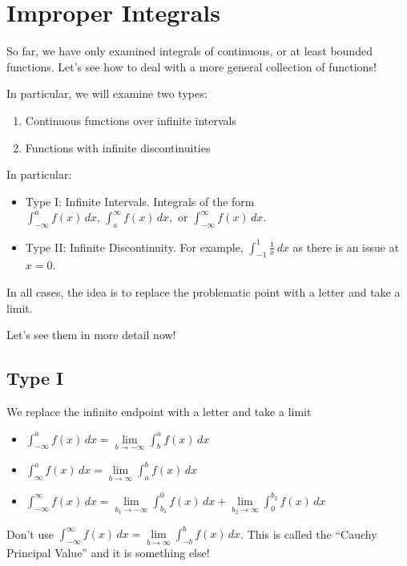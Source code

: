 \section{Improper Integrals}
So far, we have only examined integrals of continuous, or at
least bounded functions. Let's see how to deal with a more general
collection of functions!

In particular, we will examine two types:
\begin{enumerate}[label=(\arabic*)]
    \item Continuous functions over infinite intervals
    \item Functions with infinite discontinuities
\end{enumerate}

In particular:
\begin{itemize}
    \item Type I\@: Infinite Intervals. Integrals of the form
          $ \displaystyle \int_{-\infty}^{a} f(x)\, d{x},\,
              \int_{a}^{\infty} f(x)\, d{x},\text{ or }
              \int_{-\infty}^{\infty} f(x)\, d{x} $.
    \item Type II\@: Infinite Discontinuity. For example,
          $ \displaystyle \int_{-1}^{1} \frac{1}{x} \, d{x} $
          as there is an issue at $ x=0 $.
\end{itemize}

In all cases, the idea is to replace the problematic point with a
letter and take a limit.

Let's see them in more detail now!

\subsection*{Type I}
We replace the infinite endpoint with a letter and take a limit
\begin{itemize}
    \item $ \displaystyle \int_{-\infty}^{a} f(x)\, d{x} =\lim\limits_{{b} \to {-\infty}}
              \int_{b}^{a} f(x)\, d{x} $
    \item $ \displaystyle \int_{\infty}^{a} f(x)\, d{x} =\lim\limits_{{b} \to {\infty}}
              \int_{a}^{b} f(x)\, d{x} $
    \item $ \displaystyle  \int_{-\infty}^{\infty} f(x)\, d{x}=
              \lim\limits_{{b_1} \to {-\infty}} \int_{b_1}^{0} f(x)\, d{x}+
              \lim\limits_{{b_2} \to {\infty}} \int_{0}^{b_2} f(x)\, d{x} $
\end{itemize}
\begin{Remark}{}{}
    Don't use
    $ \displaystyle \int_{-\infty}^{\infty} f(x)\, d{x}=\lim\limits_{{b} \to {\infty}}
        \int_{-b}^{b} f(x)\, d{x} $.
    This is called the ``Cauchy Principal Value'' and it is something else!
\end{Remark}


